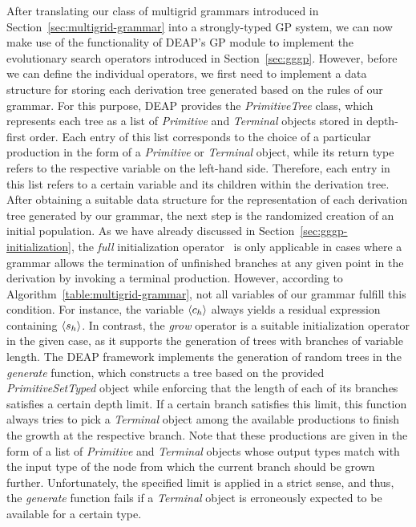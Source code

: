 After translating our class of multigrid grammars introduced in Section~\ref{sec:multigrid-grammar} into a strongly-typed GP system, we can now make use of the functionality of DEAP's GP module to implement the evolutionary search operators introduced in Section~\ref{sec:gggp}.
However, before we can define the individual operators, we first need to implement a data structure for storing each derivation tree generated based on the rules of our grammar.
For this purpose, DEAP provides the \emph{PrimitiveTree} class, which represents each tree as a list of \emph{Primitive} and \emph{Terminal} objects stored in depth-first order.
Each entry of this list corresponds to the choice of a particular production in the form of a \emph{Primitive} or \emph{Terminal} object, while its return type refers to the respective variable on the left-hand side.
Therefore, each entry in this list refers to a certain variable and its children within the derivation tree.
After obtaining a suitable data structure for the representation of each derivation tree generated by our grammar, the next step is the randomized creation of an initial population.
As we have already discussed in Section~\ref{sec:gggp-initialization}, the \emph{full} initialization operator~\cite{koza1994genetic,poli2008field} is only applicable in cases where a grammar allows the termination of unfinished branches at any given point in the derivation by invoking a terminal production.
However, according to Algorithm~\ref{table:multigrid-grammar}, not all variables of our grammar fulfill this condition.
For instance, the variable $\langle c_h \rangle$ always yields a residual expression containing $\langle s_h \rangle$.
In contrast, the \emph{grow} operator is a suitable initialization operator in the given case, as it supports the generation of trees with branches of variable length. 
The DEAP framework implements the generation of random trees in the \emph{generate} function, which constructs a tree based on the provided \emph{PrimitiveSetTyped} object while enforcing that the length of each of its branches satisfies a certain depth limit.
If a certain branch satisfies this limit, this function always tries to pick a \emph{Terminal} object among the available productions to finish the growth at the respective branch. 
Note that these productions are given in the form of a list of \emph{Primitive} and \emph{Terminal} objects whose output types match with the input type of the node from which the current branch should be grown further.
Unfortunately, the specified limit is applied in a strict sense, and thus, the \emph{generate} function fails if a \emph{Terminal} object is erroneously expected to be available for a certain type.
